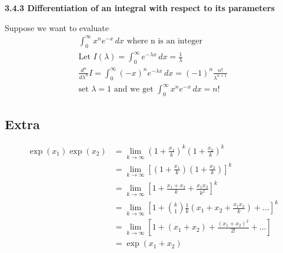 \textbf{3.4.3 Differentiation of an integral with respect to its parameters}

\begin{example}
Suppose we want to evaluate
\begin{align*}
    \int_{0}^{\infty} x^n e^{-x} \,dx \text{ where n is an integer} \\
    \text{Let } I(\lambda) = \int_{0}^{\infty} e^{-\lambda x} \,dx = \frac{1}{\lambda} \\
    \frac{d^n}{d \lambda^n} I = \int_{0}^{\infty} (-x)^n e^{-\lambda x} \,dx = (-1)^n \frac{n!}{\lambda^{n + 1}} \\
    \text{set } \lambda = 1 \text{ and we get } \int_{0}^{\infty} x^n e^{-x} \,dx = n!
\end{align*}
\end{example}



\subsection{Extra}

\begin{align*}
    \exp \left(x_1 \right) \exp \left(x_2 \right) &= \lim_{k \to \infty} \left(1 + \frac{x_1}{k}\right)^k \left(1 + \frac{x_2}{k}\right)^k \\
    &= \lim_{k \to \infty} \left[ \left(1 + \frac{x_1}{k}\right)\left(1 + \frac{x_2}{k}\right) \right]^k \\
    &= \lim_{k \to \infty} \left[ 1 + \frac{x_1 + x_2}{k} + \frac{x_1 x_2}{k^2} \right]^k \\
    &= \lim_{k \to \infty} \left[ 1 + \binom{k}{1} \frac{1}{k} \left(x_1 + x_2 + \frac{x_1 x_2}{k} \right) + \ldots \right]^k \\
    &= \lim_{k \to \infty} \left[ 1 + \left( x_1 + x_2 \right) + \frac{\left( x_1 + x_2 \right)^2}{2!} + \ldots \right] \\
    &= \exp \left( x_1 + x_2 \right)
\end{align*}

%  


 


